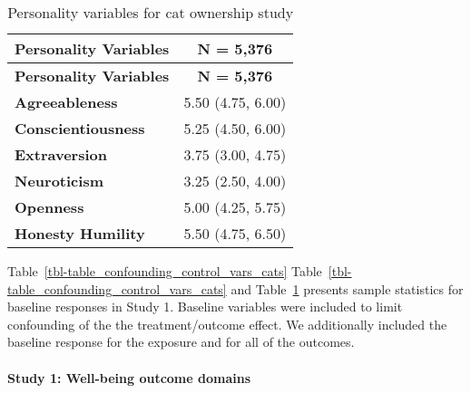 \documentclass[
  singlecolumn,
  9pt]{article}
\let\oldparagraph\paragraph
\renewcommand{\paragraph}[1]{\oldparagraph{#1}\mbox{}}
\begin{document}
\hypertarget{tbl-table_baseline_personality_cats}{}
\begin{longtable}[]{@{}lc@{}}
\caption{\label{tbl-table_baseline_personality_cats}Personality
variables for cat ownership study}\tabularnewline
\toprule\noalign{}
\textbf{Personality Variables} & \textbf{N = 5,376} \\
\midrule\noalign{}
\endfirsthead
\toprule\noalign{}
\textbf{Personality Variables} & \textbf{N = 5,376} \\
\midrule\noalign{}
\endhead
\bottomrule\noalign{}
\endlastfoot
\textbf{Agreeableness} & 5.50 (4.75, 6.00) \\
\textbf{Conscientiousness} & 5.25 (4.50, 6.00) \\
\textbf{Extraversion} & 3.75 (3.00, 4.75) \\
\textbf{Neuroticism} & 3.25 (2.50, 4.00) \\
\textbf{Openness} & 5.00 (4.25, 5.75) \\
\textbf{Honesty Humility} & 5.50 (4.75, 6.50) \\
\end{longtable}

Table~\ref{tbl-table_confounding_control_vars_cats}
Table~\ref{tbl-table_confounding_control_vars_cats} and
Table~\ref{tbl-table_baseline_personality_cats} presents sample
statistics for baseline responses in Study 1. Baseline variables were
included to limit confounding of the the treatment/outcome effect. We
additionally included the baseline response for the exposure and for all
of the outcomes.

\paragraph{Study 1: Well-being outcome
domains}\label{study-1-well-being-outcome-domains}
\end{document}
